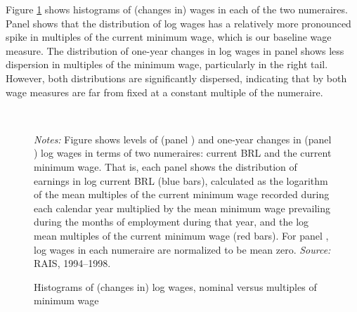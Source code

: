 Figure \ref{fig:nominal_vs_multiples} shows histograms of (changes in) wages in each of the two numeraires. Panel  shows that the distribution of log wages has a relatively more pronounced spike in multiples of the current minimum wage, which is our baseline wage measure. The distribution of one-year changes in log wages in panel  shows less dispersion in multiples of the minimum wage, particularly in the right tail. However, both distributions are significantly dispersed, indicating that by both wage measures are far from fixed at a constant multiple of the numeraire.


\begin{figure}[!htb]
  \centering
  \caption{\label{fig:nominal_vs_multiples}Histograms of (changes in) log wages, nominal versus multiples of minimum wage}
  \prefigvspace
  \\
  \postfigvspace
  \begin{minipage}[t]{1\columnwidth}%
    \begin{spacing}{0.75}
      \emph{\scriptsize{}Notes:}{\scriptsize{} Figure shows levels of (panel ) and one-year changes in (panel ) log wages in terms of two numeraires: current BRL and the current minimum wage. That is, each panel shows the distribution of earnings in log current BRL (blue bars), calculated as the logarithm of the mean multiples of the current minimum wage recorded during each calendar year multiplied by the mean minimum wage prevailing during the months of employment during that year, and the log mean multiples of the current minimum wage (red bars). For panel , log wages in each numeraire are normalized to be mean zero. %
      \emph{\scriptsize{}Source: } RAIS, 1994--1998.}
    \end{spacing}
  \end{minipage}
\end{figure}


